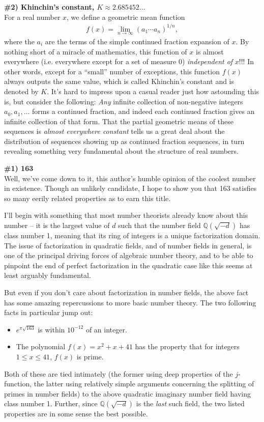 \documentclass[12pt]{article}
\newcommand{\mb}{\mathbb}
\newcommand{\ra}{\rightarrow}
\newcommand{\Q}{\mb{Q}}
\newcommand{\<}{\langle}
\renewcommand{\>}{\rangle}
\begin{document}
\textbf{{\Large \#2) Khinchin's constant, $K\approx 2.685452...$}}\\ 
For a real number $x$, we define a geometric mean function 
\begin{align*}
f(x)=\lim\limits_{n\ra\infty}(a_1\cdots a_n)^{1/n},
\end{align*}
where the $a_i$ are the terms of the simple continued fraction
expansion of $x$. By nothing short of a miracle of mathematics, this
function of $x$ is almost everywhere (i.e. everywhere except for a set
of measure 0) \emph{independent of }$x$!!!  In other words, except for
a ``small'' number of exceptions, this function $f(x)$ always outputs
the same value, which is called Khinchin's constant and is denoted by
$K$.  It's hard to impress upon a casual reader just how astounding
this is, but consider the following: \emph{Any} infinite collection of
non-negative integers $a_0, a_1, \ldots$ forms a continued fraction,
and indeed each continued fraction gives an infinite collection of
that form.  That the partial geometric means of these sequences is
\emph{almost everywhere constant} tells us a great deal about the
distribution of sequences showing up as continued fraction sequences,
in turn revealing something very fundamental about the structure of
real numbers.

\textbf{{\Large \#1) 163}}\\ Well, we've come down to it, this
author's humble opinion of the coolest number in existence.  Though an
unlikely candidate, I hope to show you that 163 satisfies so many
eerily related properties as to earn this title.

I'll begin with something that most number theorists already know
about this number -- it is the largest value of $d$ such that the
number field $\Q(\sqrt{-d})$ has class number 1, meaning that its ring
of integers is a unique factorization domain.  The issue of
factorization in quadratic fields, and of number fields in general, is
one of the principal driving forces of algebraic number theory, and to
be able to pinpoint the end of perfect factorization in the quadratic
case like this seems at least arguably fundamental.

But even if you don't care about factorization in number fields, the
above fact has some amazing repercussions to more basic number theory.
The two following facts in particular jump out:
\begin{itemize}
\item $e^{\pi\sqrt{163}}$ is within $10^{-12}$ of an integer.
\item The polynomial $f(x)=x^2+x+41$ has the property that for integers
$1\leq x\leq 41$, $f(x)$ is prime.
\end{itemize}
Both of these are tied intimately (the former using deep properties of
the $j$-function, the latter using relatively simple arguments
concerning the splitting of primes in number fields) to the above
quadratic imaginary number field having class number 1.  Further,
since $\Q(\sqrt{-d})$ is the \emph{last} such field, the two listed
properties are in some sense the best possible.
\end{document}
